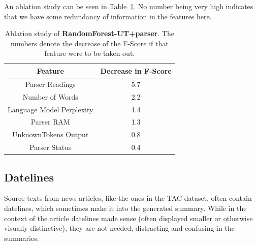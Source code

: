 \documentclass[a4paper,10pt]{scrartcl}
\theoremstyle{style}
\begin{document}
An ablation study can be seen in Table~\ref{ablation_study_randomforest}. No number being very high indicates that we have some redundancy of information in the features here.
\begin{table}
\begin{center}
\begin{tabular}{c|c}
  \hline\hline
  Feature & Decrease in F-Score\\%
  \hline
  Parser Readings & 5.7\\%
  Number of Words & 2.2\\%
  Language Model Perplexity & 1.4\\%
  Parser RAM & 1.3\\%
  UnknownTokens Output & 0.8\\%
  Parser Status & 0.4\\%
  \hline\hline
  \end{tabular}
  \end{center}

  \caption{Ablation study of \textbf{RandomForest-UT+parser}. The numbers denote the decrease of the F-Score if that feature were to be taken out.}
  \label{ablation_study_randomforest}
 \end{table}


\subsection{Datelines}
\label{s_datelines}
Source texts from news articles, like the ones in the TAC dataset, often contain datelines, which sometimes make it into the generated summary. While in the context of the article datelines made sense (often displayed smaller or otherwise visually distinctive), they are not needed, distracting and confusing in the summaries.
\end{document}
